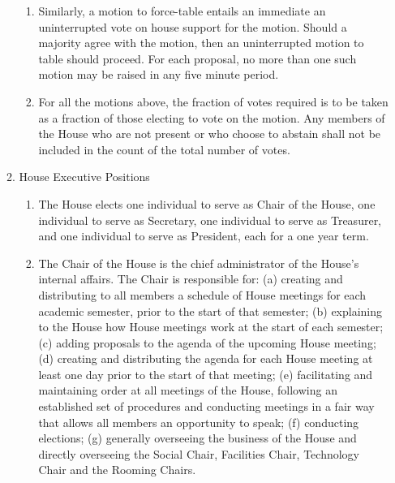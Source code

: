 \documentclass[letterpaper]{article}
\begin{document}
\begin{enumerate}
\begin{enumerate}
\begin{enumerate}
\item Similarly, a motion to force-table entails an immediate an uninterrupted vote on house support for the motion. Should a majority agree with the motion, then an uninterrupted motion to table should proceed. For each proposal, no more than one such motion may be raised in any five minute period.

\item For all the motions above, the fraction of votes required is to be taken as a fraction of those electing to vote on the motion. Any members of the House who are not present or who choose to abstain shall not be included in the count of the total number of votes.

\end{enumerate}

\item House Executive Positions

\begin{enumerate}

\item The House elects one individual to serve as Chair of the House, one individual to serve as Secretary, one individual to serve as Treasurer, and one individual to serve as President, each for a one year term.

\item The Chair of the House is the chief administrator of the House's internal affairs. The Chair is responsible for: (a) creating and distributing to all members a schedule of House meetings for each academic semester, prior to the start of that semester; (b) explaining to the House how House meetings work at the start of each semester; (c) adding proposals to the agenda of the upcoming House meeting; (d) creating and distributing the agenda for each House meeting at least one day prior to the start of that meeting; (e) facilitating and maintaining order at all meetings of the House, following an established set of procedures and conducting meetings in a fair way that allows all members an opportunity to speak; (f) conducting elections; (g) generally overseeing the business of the House and directly overseeing the Social Chair, Facilities Chair, Technology Chair and the Rooming Chairs.


\end{enumerate}
\end{enumerate}
\end{enumerate}
\end{document}
